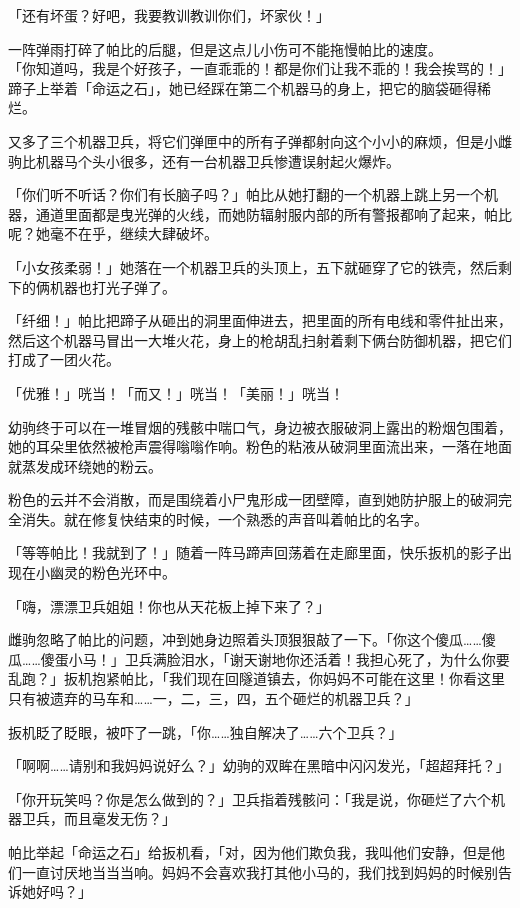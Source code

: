 「还有坏蛋？好吧，我要教训教训你们，坏家伙！」

一阵弹雨打碎了帕比的后腿，但是这点儿小伤可不能拖慢帕比的速度。\\「你知道吗，我是个好孩子，一直乖乖的！都是你们让我不乖的！我会挨骂的！」蹄子上举着「命运之石」，她已经踩在第二个机器马的身上，把它的脑袋砸得稀烂。



又多了三个机器卫兵，将它们弹匣中的所有子弹都射向这个小小的麻烦，但是小雌驹比机器马个头小很多，还有一台机器卫兵惨遭误射起火爆炸。

「你们听不听话？你们有长脑子吗？」帕比从她打翻的一个机器上跳上另一个机器，通道里面都是曳光弹的火线，而她防辐射服内部的所有警报都响了起来，帕比呢？她毫不在乎，继续大肆破坏。

「小女孩柔弱！」她落在一个机器卫兵的头顶上，五下就砸穿了它的铁壳，然后剩下的俩机器也打光子弹了。

「纤细！」帕比把蹄子从砸出的洞里面伸进去，把里面的所有电线和零件扯出来，然后这个机器马冒出一大堆火花，身上的枪胡乱扫射着剩下俩台防御机器，把它们打成了一团火花。

「优雅！」咣当！「而又！」咣当！「美丽！」咣当！

幼驹终于可以在一堆冒烟的残骸中喘口气，身边被衣服破洞上露出的粉烟包围着，她的耳朵里依然被枪声震得嗡嗡作响。粉色的粘液从破洞里面流出来，一落在地面就蒸发成环绕她的粉云。

粉色的云并不会消散，而是围绕着小尸鬼形成一团壁障，直到她防护服上的破洞完全消失。就在修复快结束的时候，一个熟悉的声音叫着帕比的名字。

「等等帕比！我就到了！」随着一阵马蹄声回荡着在走廊里面，快乐扳机的影子出现在小幽灵的粉色光环中。

「嗨，漂漂卫兵姐姐！你也从天花板上掉下来了？」

雌驹忽略了帕比的问题，冲到她身边照着头顶狠狠敲了一下。「你这个傻瓜……傻瓜……傻蛋小马！」卫兵满脸泪水，「谢天谢地你还活着！我担心死了，为什么你要乱跑？」扳机抱紧帕比，「我们现在回隧道镇去，你妈妈不可能在这里！你看这里只有被遗弃的马车和……一，二，三，四，五个砸烂的机器卫兵？」

扳机眨了眨眼，被吓了一跳，「你……独自解决了……六个卫兵？」

「啊啊……请别和我妈妈说好么？」幼驹的双眸在黑暗中闪闪发光，「超超拜托？」

「你开玩笑吗？你是怎么做到的？」卫兵指着残骸问：「我是说，你砸烂了六个机器卫兵，而且毫发无伤？」

帕比举起「命运之石」给扳机看，「对，因为他们欺负我，我叫他们安静，但是他们一直讨厌地当当当响。妈妈不会喜欢我打其他小马的，我们找到妈妈的时候别告诉她好吗？」

